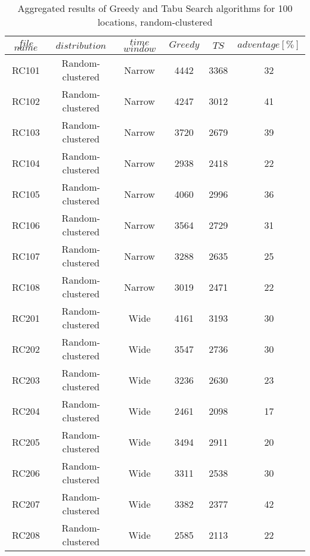 \begin{table}[t]
\centering
\caption{
Aggregated results of Greedy and Tabu Search algorithms for 100 locations, random-clustered}
\begin{tabular*}{0.8\linewidth}{@{\extracolsep{\fill}}cccccc}
\toprule
$file$ $name$ & $distribution$ & $time$ $window$ & $Greedy$ & $TS$ & $adventage[\%]$ \\ \midrule
RC101 & Random-clustered & Narrow & 4442 & 3368 & 32\\
RC102 & Random-clustered & Narrow & 4247 & 3012 & 41\\
RC103 & Random-clustered & Narrow & 3720 & 2679 & 39\\
RC104 & Random-clustered & Narrow & 2938 & 2418 & 22\\
RC105 & Random-clustered & Narrow & 4060 & 2996 & 36\\
RC106 & Random-clustered & Narrow & 3564 & 2729 & 31\\
RC107 & Random-clustered & Narrow & 3288 & 2635 & 25\\
RC108 & Random-clustered & Narrow & 3019 & 2471 & 22\\
RC201 & Random-clustered & Wide & 4161 & 3193 & 30\\
RC202 & Random-clustered & Wide & 3547 & 2736 & 30\\
RC203 & Random-clustered & Wide & 3236 & 2630 & 23\\
RC204 & Random-clustered & Wide & 2461 & 2098 & 17\\
RC205 & Random-clustered & Wide & 3494 & 2911 & 20\\
RC206 & Random-clustered & Wide & 3311 & 2538 & 30\\
RC207 & Random-clustered & Wide & 3382 & 2377 & 42\\
RC208 & Random-clustered & Wide & 2585 & 2113 & 22\\
\end{tabular*}\end{table}